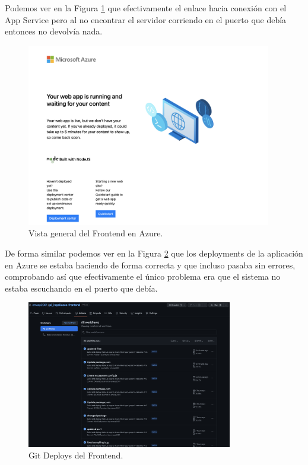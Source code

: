 \documentclass{article}
\begin{document}
Podemos ver en la Figura \ref{fig:frontend} que efectivamente el enlace hacia conexión con
el App Service pero al no encontrar el servidor corriendo en el puerto que debía entonces no devolvía nada.
\begin{figure}[h]
  \centering
  \includegraphics[width=0.95\textwidth]{azure_frontend_status.png}
  \caption{Vista general del Frontend en Azure.}
  \label{fig:frontend}
 \end{figure}

 De forma similar podemos ver en la Figura \ref{fig:git_deploys} que los deployments de la
 aplicación en Azure se estaba haciendo de forma correcta y que incluso pasaba sin errores,
 comprobando así que efectivamente el único problema era que el sistema no estaba escuchando
 en el puerto que debía.
 \begin{figure}[h]
  \centering
  \includegraphics[width=0.80\textwidth]{git_deploys.png}
  \caption{Git Deploys del Frontend.}
  \label{fig:git_deploys}
 \end{figure}
\end{document}
